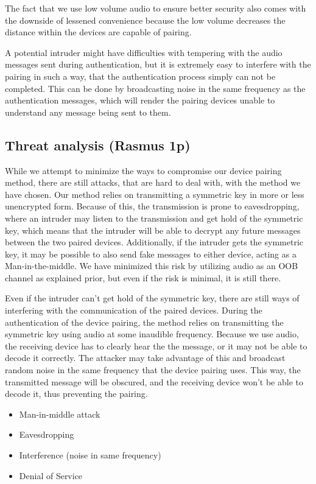 \documentclass[12pt]{article}
\begin{document}
The fact that we use low volume audio to ensure better security also comes with the downside of lessened convenience because the low volume decreases the distance within the devices are capable of pairing.

A potential intruder might have difficulties with tempering with the audio messages sent during authentication, but it is extremely easy to interfere with the pairing in such a way, that the authentication process simply can not be completed. This can be done by broadcasting noise in the same frequency as the authentication messages, which will render the pairing devices unable to understand any message being sent to them.


\subsection{Threat analysis (Rasmus 1p)}
\label{sub:Threat analysis}

While we attempt to minimize the ways to compromise our device pairing method, there are still attacks, that are hard to deal with, with the method we have chosen. Our method relies on transmitting a symmetric key in more or less unencrypted form. Because of this, the transmission is prone to eavesdropping, where an intruder may listen to the transmission and get hold of the symmetric key, which means that the intruder will be able to decrypt any future messages between the two paired devices. Additionally, if the intruder gets the symmetric key, it may be possible to also send fake messages to either device, acting as a Man-in-the-middle. We have minimized this risk by utilizing audio as an OOB channel as explained prior, but even if the risk is minimal, it is still there.

Even if the intruder can't get hold of the symmetric key, there are still ways of interfering with the communication of the paired devices. During the authentication of the device pairing, the method relies on transmitting the symmetric key using audio at some inaudible frequency. Because we use audio, the receiving device has to clearly hear the the message, or it may not be able to decode it correctly. The attacker may take advantage of this and broadcast random noise in the same frequency that the device pairing uses. This way, the transmitted message will be obscured, and the receiving device won't be able to decode it, thus preventing the pairing.





\begin{itemize}
    \item Man-in-middle attack
    \item Eavesdropping
    \item Interference (noise in same frequency)
    \item Denial of Service
\end{itemize}
\end{document}
